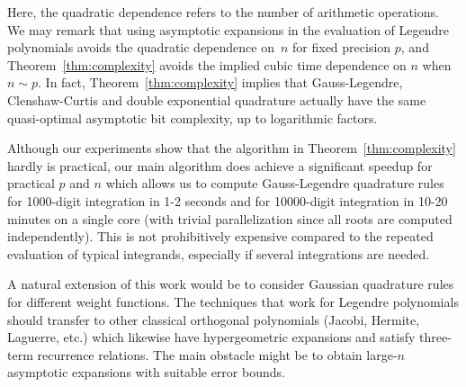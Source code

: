 \documentclass[11pt,a4paper]{article}
\begin{document}
Here, the quadratic dependence refers to the number of arithmetic operations.
We may remark that using asymptotic expansions in the
evaluation of Legendre polynomials avoids the quadratic
dependence on~$n$ for fixed precision $p$, and Theorem~\ref{thm:complexity}
avoids the implied cubic time dependence on $n$ when $n \sim p$.
In fact, Theorem~\ref{thm:complexity} implies that
Gauss-Legendre, Clenshaw-Curtis and double exponential
quadrature actually have the same quasi-optimal asymptotic bit complexity,
up to logarithmic factors.

Although our experiments show that the algorithm in Theorem~\ref{thm:complexity}
hardly is practical, our main algorithm does achieve a
significant speedup for practical $p$ and $n$
which allows us to compute Gauss-Legendre quadrature rules for
1000-digit integration in 1-2 seconds and for 10000-digit integration in 10-20 minutes
on a single core (with trivial parallelization since all roots
are computed independently). This is not prohibitively
expensive compared to the repeated evaluation
of typical integrands, especially if several integrations are needed.

A natural extension of this work would be to
consider Gaussian quadrature rules for different
weight functions.
The techniques that work for Legendre polynomials should transfer to other
classical orthogonal polynomials (Jacobi, Hermite, Laguerre, etc.)
which likewise have hypergeometric expansions
and satisfy three-term recurrence relations.
The main obstacle might be
to obtain large-$n$ asymptotic expansions with suitable error bounds.



\end{document}
